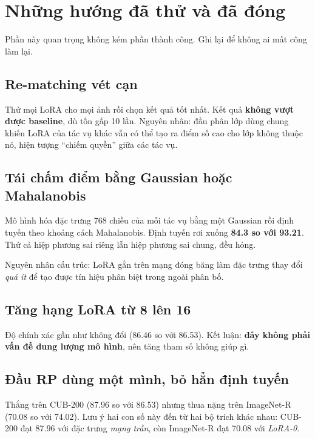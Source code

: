 \documentclass[11pt,a4paper]{article}
\begin{document}
\section{Những hướng đã thử và đã đóng}

Phần này quan trọng không kém phần thành công. Ghi lại để không ai mất công làm
lại.

\subsection{Re-matching vét cạn}

Thử mọi LoRA cho mọi ảnh rồi chọn kết quả tốt nhất. Kết quả \textbf{không vượt
được baseline}, dù tốn gấp 10 lần. Nguyên nhân: đầu phân lớp dùng chung khiến
LoRA của tác vụ khác vẫn có thể tạo ra điểm số cao cho lớp không thuộc nó, hiện
tượng ``chiếm quyền'' giữa các tác vụ.

\subsection{Tái chấm điểm bằng Gaussian hoặc Mahalanobis}

Mô hình hóa đặc trưng 768 chiều của mỗi tác vụ bằng một Gaussian rồi định tuyến
theo khoảng cách Mahalanobis. Định tuyến rơi xuống \textbf{84.3 so với 93.21}.
Thử cả hiệp phương sai riêng lẫn hiệp phương sai chung, đều hỏng.

Nguyên nhân cấu trúc: LoRA gắn trên mạng đóng băng làm đặc trưng thay đổi
\emph{quá ít} để tạo được tín hiệu phân biệt trong ngoài phân bố.

\subsection{Tăng hạng LoRA từ 8 lên 16}

Độ chính xác gần như không đổi (86.46 so với 86.53). Kết luận: \textbf{đây không
phải vấn đề dung lượng mô hình}, nên tăng tham số không giúp gì.

\subsection{Đầu RP dùng một mình, bỏ hẳn định tuyến}

Thắng trên CUB-200 (87.96 so với 86.53) nhưng thua nặng trên ImageNet-R (70.08 so
với 74.02). Lưu ý hai con số này đến từ hai bộ trích khác nhau: CUB-200 đạt 87.96
với đặc trưng \emph{mạng trần}, còn ImageNet-R đạt 70.08 với \emph{LoRA-0}.
\end{document}
